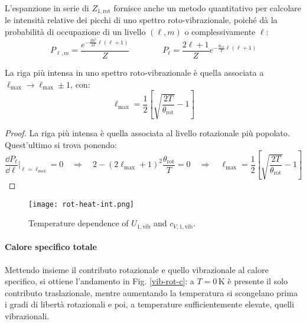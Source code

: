 L'espanzione in serie di $ Z_{1,\text{rot}} $ fornisce anche un metodo quantitativo per calcolare le intensità relative dei picchi di uno spettro roto-vibrazionale, poiché dà la probabilità di occupazione di un livello $ (\ell,m) $ o complessivamente $ \ell $:
\begin{equation}
	P_{\ell,m} = \frac{e^{- \frac{\beta \hbar^2}{2I} \ell (\ell + 1)}}{Z}
	\qquad \qquad
	P_\ell = \frac{2\ell + 1}{Z} e^{- \frac{\theta_\text{rot}}{T} \ell (\ell + 1)}
\end{equation}

\begin{proposition}{}{}
	La riga più intensa in uno spettro roto-vibrazionale è quella associata a $ \ell_\text{max} \rightarrow \ell_\text{max} \pm 1 $, con:
	\begin{equation}
		\ell_\text{max} = \frac{1}{2} \left[ \sqrt{\frac{2T}{\theta_\text{rot}}} - 1 \right]
	\end{equation}

	\tcblower

	\begin{proof}
		La riga più intensa è quella associata al livello rotazionale più popolato. Quest'ultimo si trova ponendo:
		\begin{equation*}
			\frac{\dd P_\ell}{\dd \ell}\bigg\vert_{\ell = \ell_\text{max}} = 0
			\quad \Rightarrow \quad
			2 - (2 \ell_\text{max} + 1)^2 \frac{\theta_\text{rot}}{T} = 0
			\quad \Rightarrow \quad
			\ell_\text{max} = \frac{1}{2} \left[ \sqrt{\frac{2T}{\theta_\text{rot}}} - 1 \right]
		\end{equation*}
	\end{proof}
\end{proposition}

\begin{figure}
	\centering
	\texttt{[image: rot-heat-int.png]}
	\caption{Temperature dependence of $ U_{1,\text{vib}} $ and $ c_{V,1,\text{vib}} $.}
	\label{rot-heat-int}
\end{figure}

\paragraph{Calore specifico totale}

Mettendo insieme il contributo rotazionale e quello vibrazionale al calore specifico, si ottiene l'andamento in Fig. \ref{vib-rot-c}: a $ T = 0 \,\text{K} $ è presente il solo contributo traslazionale, mentre aumentando la temperatura si scongelano prima i gradi di libertà rotazionali e poi, a temperature sufficientemente elevate, quelli vibrazionali.

